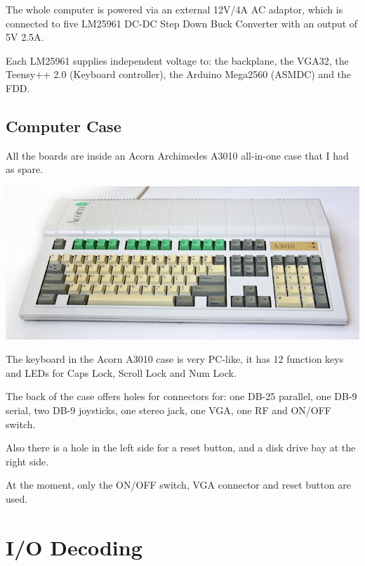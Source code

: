 \documentclass[a4paper,11pt]{article}
\begin{document}
    The whole computer is powered via an external 12V/4A AC adaptor, which is 
    connected to five LM25961 DC-DC Step Down Buck Converter with an output of
    5V 2.5A.

    Each LM25961 supplies independent voltage to: the backplane, the VGA32, the
    Teensy++ 2.0 (Keyboard controller), the Arduino Mega2560 (ASMDC) and the FDD.

    \subsection{Computer Case}

    All the boards are inside an Acorn Archimedes A3010 all-in-one case that I
    had as spare.

    \begin{center}
        \includegraphics{acorn3010top.jpg}
    \end{center}

    The keyboard in the Acorn A3010 case is very PC-like, it has 12 function
    keys and LEDs for Caps Lock, Scroll Lock and Num Lock.

    The back of the case offers holes for connectors for: one DB-25 parallel, 
    one DB-9 serial, two DB-9 joysticks, one stereo jack, one VGA, one RF and
    ON/OFF switch.

    Also there is a hole in the left side for a reset button, and a disk drive
    bay at the right side.

    At the moment, only the ON/OFF switch, VGA connector and reset button are
    used.

    \pagebreak
    \section{I/O Decoding}
\end{document}
